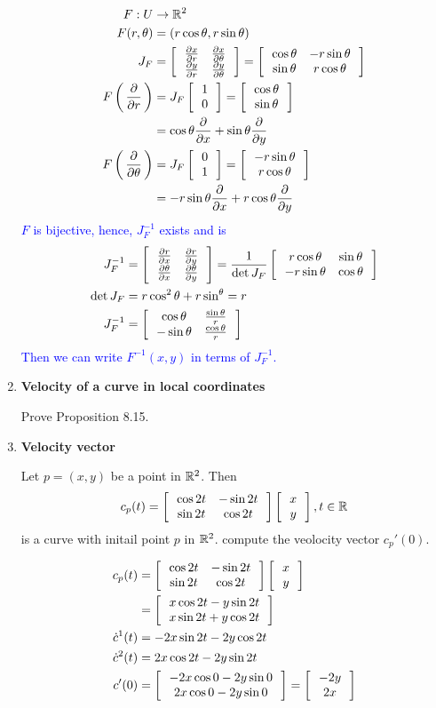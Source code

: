 \documentclass[12pt,a4paper]{report}
\newcommand{\BLUE}[1]{\textcolor{blue}{#1}}
\begin{document}
\begin{enumerate}[label=8.\arabic*.]
\BLUE{\begin{align*}
	F: U &\to \R^2 \\
	F(r,\theta) &= (r\cos \theta, r\sin \theta) \\
	J_F &= \SQTWOXTWO{\PART{x}{r}}{\PART{x}{\theta}}{\PART{y}{r}}{\PART{y}{\theta}} = \SQTWOXTWO{ \cos \theta}{-r\sin\theta}{\sin\theta}{r\cos \theta} \\
	F\PAREN{\PART{}{r}} &= J_F\SQCOLVECTOR{1 \\ 0} = \SQCOLVECTOR{\cos\theta \\ \sin \theta}\\
	&= \cos\theta \PART{}{x} + \sin\theta \PART{}{y}\\
	F\PAREN{\PART{}{\theta}} &= J_F\SQCOLVECTOR{0 \\ 1} = \SQCOLVECTOR{-r\sin\theta \\ r\cos \theta}\\
	&= -r\sin\theta \PART{}{x} + r\cos\theta \PART{}{y}
\end{align*}$F$ is bijective, hence, $J_F^{-1}$ exists and is 
\begin{align*}
	J_F^{-1} &= \SQTWOXTWO{\PART{r}{x}}{\PART{r}{y}}{\PART{\theta}{x}}{\PART{\theta}{y}} = \frac{1}{\det J_F }\SQTWOXTWO{r\cos\theta}{\sin\theta}{-r\sin\theta}{\cos\theta} \\
	\det J_F &= r\cos^2\theta +r\sin^\theta = r\\
	J_F^{-1} &= \SQTWOXTWO{\cos\theta}{\frac{\sin\theta}{r}}{-\sin\theta}{\frac{\cos\theta}{r}} 
\end{align*}Then we can write $F^{-1}(x,y)$ in terms of $J_F^{-1}$.
}

\item \textbf{Velocity of a curve in local coordinates}

Prove Proposition 8.15.

\item \textbf{Velocity vector}

Let $p=(x,y)$ be a point in $\R^2$.  Then
\begin{align*}
	c_p(t) = \SQTWOXTWO{\cos 2t}{-\sin 2t}{\sin 2t}{\cos 2t} \SQCOLVECTOR{x\\y}, t \in \R
\end{align*}is a curve with initail point $p$ in $\R^2$.  compute the veolocity vector $c_p'(0)$.

\BLUE{\begin{align*}
	c_p(t) &= \SQTWOXTWO{\cos 2t}{-\sin 2t}{\sin 2t}{\cos 2t} \SQCOLVECTOR{x\\y} \\
	&= \SQCOLVECTOR{x\cos 2t-y\sin 2t\\x\sin 2t+y\cos 2t} \\
	\dot{c}^1(t) &= -2x\sin 2t-2y\cos 2t\\
	\dot{c}^2(t) &= 2x\cos 2t -2y\sin 2t \\
	c'(0) &= \SQCOLVECTOR{-2x\cos 0-2y\sin 0\\2x\cos 0-2y \sin 0} = \SQCOLVECTOR{-2y\\2x}
\end{align*}
}


\end{enumerate}
\end{document}
